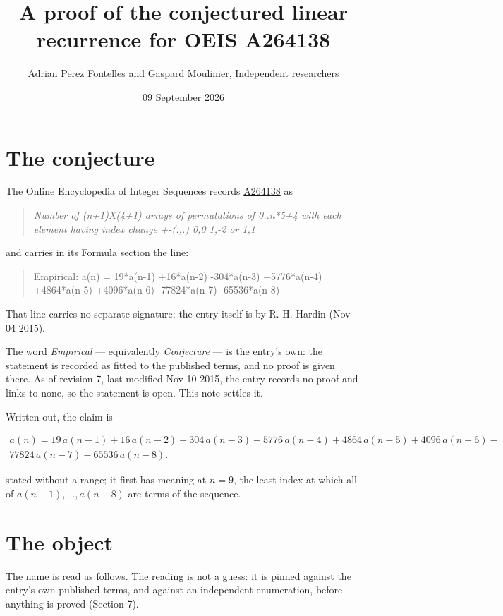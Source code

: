 \documentclass[11pt]{article}
\title{A proof of the conjectured linear recurrence for OEIS A264138}
\author{Adrian Perez Fontelles and Gaspard Moulinier, Independent researchers}
\date{09 September 2026}
\theoremstyle{definition}
\begin{document}
\maketitle
\section{The conjecture}

The Online Encyclopedia of Integer Sequences records \href{https://oeis.org/A264138}{A264138} as

\begin{quote}\itshape Number of (n+1)X(4+1) arrays of permutations of 0..n*5+4 with each element having index change +-(.,.) 0,0 1,-2 or 1,1\end{quote}

and carries in its Formula section the line:

\begin{quote}\ttfamily Empirical: a(n) = 19*a(n-1) +16*a(n-2) -304*a(n-3) +5776*a(n-4) +4864*a(n-5) +4096*a(n-6) -77824*a(n-7) -65536*a(n-8)\end{quote}

That line carries no separate signature; the entry itself is by R. H. Hardin (Nov 04 2015).

The word {\itshape Empirical} --- equivalently {\itshape Conjecture} --- is the entry's own: the statement is recorded as fitted to the published terms, and no proof is given there. As of revision 7, last modified Nov 10 2015, the entry records no proof and links to none, so the statement is open. This note settles it.

Written out, the claim is

\begin{multline*} a(n) = 19\,a(n-1) + 16\,a(n-2) - 304\,a(n-3) + 5776\,a(n-4) + 4864\,a(n-5) + 4096\,a(n-6) - \\ 77824\,a(n-7) - 65536\,a(n-8). \end{multline*}

stated without a range; it first has meaning at $n = 9$, the least index at which all of $a(n-1),\dots,a(n-8)$ are terms of the sequence.

\section{The object}

The name is read as follows. The reading is not a guess: it is pinned against the entry's own published terms, and against an independent enumeration, before anything is proved (Section 7).
\end{document}
